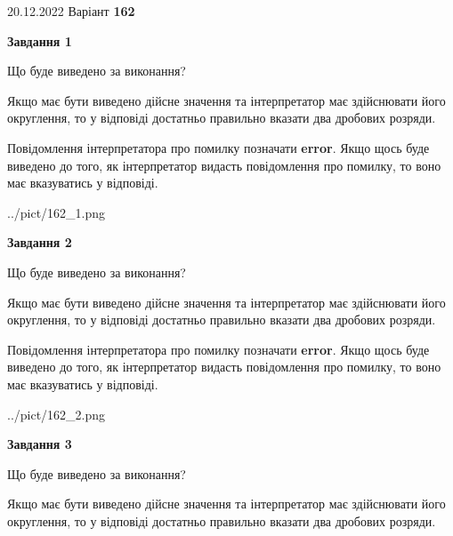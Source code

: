 \documentclass[12pt, ukrainian]{article}
\begin{document}
{20.12.2022 Варіант \No \textbf { 162 }\par}
{
\begin {Large}

{\begin {center}\textbf{Завдання 1}\end {center}}\par
Що буде виведено за виконання? \par

Якщо має бути виведено дійсне значення та інтерпретатор має здійснювати його округлення, 
то у відповіді достатньо правильно вказати два дробових розряди.

Повідомлення інтерпретатора про помилку позначати \textbf{error}.
Якщо щось буде виведено до того, як інтерпретатор видасть повідомлення про помилку, 
то воно має вказуватись у відповіді. \par

\begin{center}
	{../pict/162_1.png}
\end{center}
\newpage

{\begin {center}\textbf{Завдання 2}\end {center}}\par
Що буде виведено за виконання? \par

Якщо має бути виведено дійсне значення та інтерпретатор має здійснювати його округлення, 
то у відповіді достатньо правильно вказати два дробових розряди.

Повідомлення інтерпретатора про помилку позначати \textbf{error}.
Якщо щось буде виведено до того, як інтерпретатор видасть повідомлення про помилку, 
то воно має вказуватись у відповіді. \par

\begin{center}
	{../pict/162_2.png}
\end{center}
\newpage

{\begin {center}\textbf{Завдання 3}\end {center}}\par
Що буде виведено за виконання? \par

Якщо має бути виведено дійсне значення та інтерпретатор має здійснювати його округлення, 
то у відповіді достатньо правильно вказати два дробових розряди.


\end{Large}}
\end{document}
